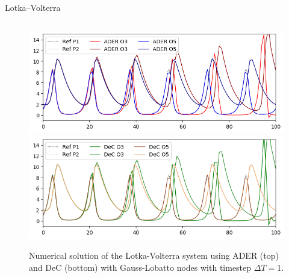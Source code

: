 \documentclass[9pt,compress,t,aspectratio=169]{beamer}
\begin{document}
\begin{frame}{Lotka--Volterra}
\begin{figure}
	\begin{columns}
\includegraphics[width=0.95\linewidth]{n100_ader.png}
\includegraphics[width=0.95\linewidth]{n100_dec.png}
\caption{Numerical solution of the Lotka-Volterra system using ADER (top) and DeC (bottom) with Gauss-Lobatto nodes with timestep $\Delta T = 1$. \label{fig:lodka-sol-dec}}
\end{columns}
\end{figure}

\end{frame}
\end{document}
